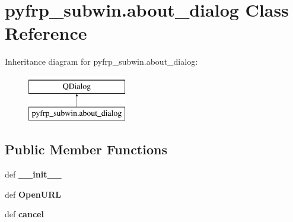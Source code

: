 \hypertarget{classpyfrp__subwin_1_1about__dialog}{\section{pyfrp\+\_\+subwin.\+about\+\_\+dialog Class Reference}
\label{classpyfrp__subwin_1_1about__dialog}
}
Inheritance diagram for pyfrp\+\_\+subwin.\+about\+\_\+dialog\+:\begin{figure}[H]
\begin{center}
\leavevmode
\includegraphics[height=2.000000cm]{classpyfrp__subwin_1_1about__dialog}
\end{center}
\end{figure}
\subsection*{Public Member Functions}
\begin{DoxyCompactItemize}
\item 
\hypertarget{classpyfrp__subwin_1_1about__dialog_ab4c8dc0b27210e6436528b25c3a0d8be}{def {\bfseries \+\_\+\+\_\+init\+\_\+\+\_\+}}\label{classpyfrp__subwin_1_1about__dialog_ab4c8dc0b27210e6436528b25c3a0d8be}

\item 
\hypertarget{classpyfrp__subwin_1_1about__dialog_ac1724af81a159443365b932aff8d052a}{def {\bfseries Open\+U\+R\+L}}\label{classpyfrp__subwin_1_1about__dialog_ac1724af81a159443365b932aff8d052a}

\item 
\hypertarget{classpyfrp__subwin_1_1about__dialog_a6e78b9d56a43afeeb1249e709c24ba0e}{def {\bfseries cancel}}\label{classpyfrp__subwin_1_1about__dialog_a6e78b9d56a43afeeb1249e709c24ba0e}

\end{DoxyCompactItemize}
